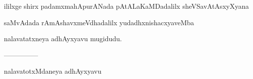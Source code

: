 \documentclass{article}
\begin{document}
\begin{center}
ililxge shirx padamxmahApurANada pAtALaKaMDadalilx sheVSavAtAsxyXyana
\end{center}

\begin{center}
saMvAdada rAmAshavxmeVdhadalilx yudadhxnishacxyaveMba
\end{center}

\begin{center}
nalavatatxneya adhAyxyavu mugidudu.
\end{center}

\begin{center}
---------------
\end{center}

\begin{center}
nalavatotxMdaneya adhAyxyavu
\end{center}
\end{document}
